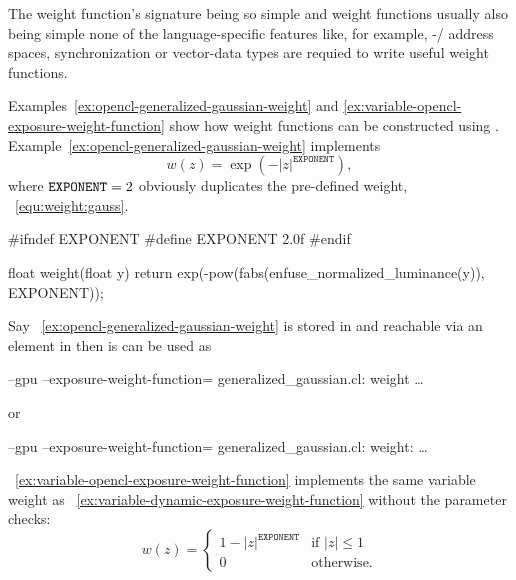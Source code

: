 \begin{geeknote}
  The weight function's signature being so simple and weight functions usually also being simple
  none of the language-specific features like, for example, -\slash{}
  address spaces, synchronization or vector-data types are requied to write useful weight
  functions.
\end{geeknote}

Examples~\ref{ex:opencl-generalized-gaussian-weight} and
\ref{ex:variable-opencl-exposure-weight-function} show how weight functions can be constructed
using .  Example~\ref{ex:opencl-generalized-gaussian-weight} implements
\[
    w(z) = \exp\left(-|z|^{\mathtt{EXPONENT}}\right),
\]
where $\texttt{EXPONENT} = 2$ obviously duplicates the pre-defined  weight,
\equationabbr~\ref{equ:weight:gauss}.

\begin{exemplar}[htbp]
  \begin{cxxlisting}
#ifndef EXPONENT
#define EXPONENT 2.0f
#endif

float weight(float y)
{
    return exp(-pow(fabs(enfuse_normalized_luminance(y)),
                    EXPONENT));
}
  \end{cxxlisting}

  \caption[Generalized  weight function]{%
    \label{ex:opencl-generalized-gaussian-weight}%
    Generalized  weight function written in .  Note the
    definition of a default parameter, .}
\end{exemplar}

Say \exampleName~\ref{ex:opencl-generalized-gaussian-weight} is stored in
 and reachable via an element in
 then is can be used as
\begin{literal}
  \app{} --gpu --exposure-weight-function=\feasiblebreak
  generalized\_gaussian.cl:\feasiblebreak
  weight \dots
\end{literal}
or
\begin{literal}
  \app{} --gpu --exposure-weight-function=\feasiblebreak
  generalized\_gaussian.cl:\feasiblebreak
  weight: \dots
\end{literal}

\exampleName~\ref{ex:variable-opencl-exposure-weight-function} implements the same variable
weight as \exampleName~\ref{ex:variable-dynamic-exposure-weight-function} without the parameter
checks:
\[
    w(z) =
    \left\{
      \begin{array}{cl}
        1 - |z|^{\mathtt{EXPONENT}} & \mbox{if } |z| \leq 1 \\
        0                         & \mbox{otherwise.}
      \end{array}
    \right.
\]

